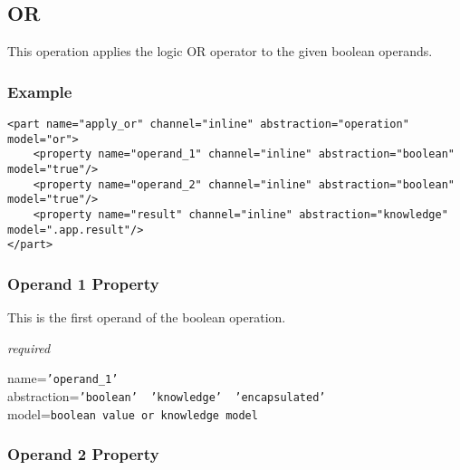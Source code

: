 %
%
%
%
%
%

\subsection{OR}
\label{or_heading}

This operation applies the logic OR operator to the given boolean operands.

\subsubsection{Example}

\begin{scriptsize}
    \begin{verbatim}
<part name="apply_or" channel="inline" abstraction="operation" model="or">
    <property name="operand_1" channel="inline" abstraction="boolean" model="true"/>
    <property name="operand_2" channel="inline" abstraction="boolean" model="true"/>
    <property name="result" channel="inline" abstraction="knowledge" model=".app.result"/>
</part>
    \end{verbatim}
\end{scriptsize}

\subsubsection{Operand 1 Property}

This is the first operand of the boolean operation.

\emph{required}

name=\texttt{'operand\_1'}\\
abstraction=\texttt{'boolean' \vline\ 'knowledge' \vline\ 'encapsulated'}\\
model=\texttt{boolean value or knowledge model}

\subsubsection{Operand 2 Property}

